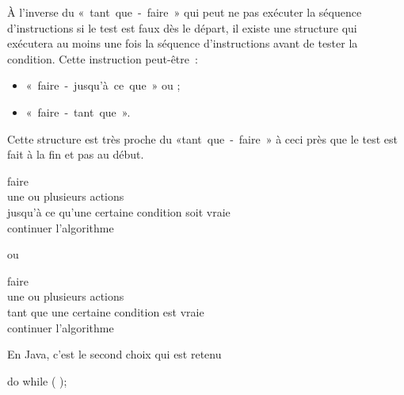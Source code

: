 	À l'inverse du «~tant~que~-~faire~» qui peut ne pas exécuter la séquence
	d'instructions si le test est faux dès le départ, il existe une structure
	qui exécutera au moins une fois la séquence d'instructions avant de tester
	la condition. Cette instruction peut-être~:

	\begin{itemize}
		\item «~faire~-~jusqu'à~ce~que~» ou ;
		\item «~faire~-~tant~que~».
	\end{itemize}
	
	Cette structure est très proche du «tant~que~-~faire~» à ceci près que le
	test est fait à la fin et pas au début.
 
	\begin{langagenaturel}
		faire\\
			\tab une ou plusieurs actions\\
		jusqu'à ce qu'une certaine condition soit vraie\\
		continuer l'algorithme 
	\end{langagenaturel}
	
	ou
	
	\begin{langagenaturel}
		faire\\
			\tab une ou plusieurs actions\\
		tant que une certaine condition est vraie\\
		continuer l'algorithme 
	\end{langagenaturel}
	
	En Java, c'est le second choix qui est retenu

	\begin{grammaire}
		    do
		    while (  );
	\end{grammaire}


